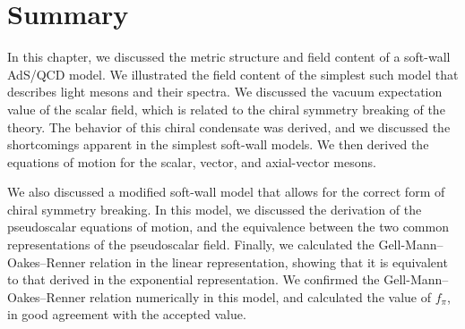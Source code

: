 \section{Summary}
In this chapter, we discussed the metric structure and field content of a soft-wall AdS/QCD model. 
We illustrated the field content of the simplest such model that describes light mesons and their spectra.
We discussed the vacuum expectation value of the scalar field, which is related to the chiral symmetry breaking of the theory.
The behavior of this chiral condensate was derived, and we discussed the shortcomings apparent in the simplest soft-wall models.
We then derived the equations of motion for the scalar, vector, and axial-vector mesons.

We also discussed a modified soft-wall model that allows for the correct form of chiral symmetry breaking.
In this model, we discussed the derivation of the pseudoscalar equations of motion, and the equivalence between the two common representations of the pseudoscalar field.
Finally, we calculated the Gell-Mann--Oakes--Renner relation in the linear representation, showing that it is equivalent to that derived in the exponential representation.
We confirmed the Gell-Mann--Oakes--Renner relation numerically in this model, and calculated the value of $f_\pi$, in good agreement with the accepted value.